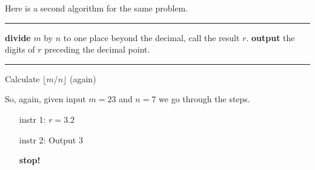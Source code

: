 \begin{exmp}
\noindent
Here is a second algorithm for the same problem.
\begin{algrthm}
  \hrule\kern5pt\relax
  \begin{algorithmic}[1]
     \State \textbf{divide} $m$ by $n$ to one place beyond the decimal, call the result $r$.
      \State \textbf{output} the digits of $r$ preceding the decimal point.
  \end{algorithmic}
  \hrule\kern5pt\relax
  \caption{Calculate $\lfloor m/n \rfloor$ (again)}
\end{algrthm}

\noindent
So, again, given input $m=23$ and $n=7$ we go through the steps.
\begin{enumerate}
 \item[instr 1:] $r = 3.2$ 
 \item[instr 2:] Output $3$
 \item[\bfseries stop!]
\end{enumerate}
\end{exmp}

